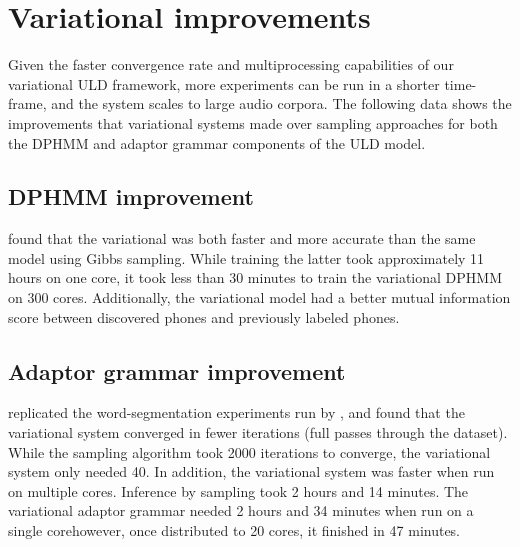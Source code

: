 \documentclass[12pt,letterpaper]{article}
\begin{document}
\section{Variational improvements}
Given the faster convergence rate and multiprocessing capabilities of our variational ULD framework, more experiments can be run in a shorter time-frame, and the system scales to large audio corpora. The following data shows the improvements that variational systems made over sampling approaches for both the DPHMM and adaptor grammar components of the ULD model. 

\subsection{DPHMM improvement}
\citet{ondel:2016} found that the variational was both faster and more accurate than the same model using Gibbs sampling. While training the latter took approximately 11 hours on one core, it took less than 30 minutes to train the variational DPHMM on 300 cores. Additionally, the variational model had a better mutual information score between discovered phones and previously labeled phones. 

\subsection{Adaptor grammar improvement}
\citet{cohen:dissertation} replicated the word-segmentation experiments run by \citet{johnson:2008}, and found that the variational system converged in fewer iterations (full passes through the dataset). While the sampling algorithm took 2000 iterations to converge, the variational system only needed 40. In addition, the variational system was faster when run on multiple cores. Inference by sampling took 2 hours and 14 minutes. The variational adaptor grammar needed 2 hours and 34 minutes when run on a single core\textemdash however, once distributed to 20 cores, it finished in 47 minutes. 
\end{document}
